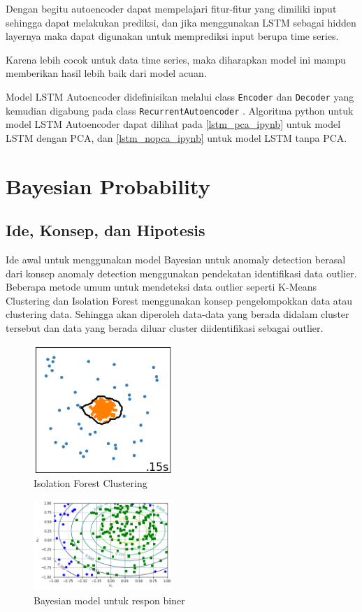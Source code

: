 Dengan begitu autoencoder dapat mempelajari fitur-fitur yang dimiliki input sehingga dapat melakukan prediksi, dan jika menggunakan LSTM sebagai hidden layernya maka dapat digunakan untuk memprediksi input berupa time series.

Karena lebih cocok untuk data time series, maka diharapkan model ini mampu memberikan hasil lebih baik dari model acuan.

Model LSTM Autoencoder didefinisikan melalui class \texttt{Encoder} dan \texttt{Decoder} yang kemudian digabung pada class \texttt{RecurrentAutoencoder} \cite{lstm}. Algoritma python untuk model LSTM Autoencoder dapat dilihat pada \ref{lstm_pca_ipynb} untuk model LSTM dengan PCA, dan \ref{lstm_nopca_ipynb} untuk model LSTM tanpa PCA.

\section{Bayesian Probability}
\subsection{Ide, Konsep, dan Hipotesis}

Ide awal untuk menggunakan model Bayesian untuk anomaly detection berasal dari konsep anomaly detection menggunakan pendekatan identifikasi data outlier. Beberapa metode umum untuk mendeteksi data outlier seperti K-Means Clustering dan Isolation Forest menggunakan konsep pengelompokkan data atau clustering data. Sehingga akan diperoleh data-data yang berada didalam cluster tersebut dan data yang berada diluar cluster diidentifikasi sebagai outlier.

\begin{figure}[h]
    \centering
    \includegraphics[width=200px]{resources/Bayes/isoforest.png}
    \caption{Isolation Forest Clustering}
\end{figure}

\begin{figure}[h]
    \centering
    \includegraphics[width=200px]{resources/Bayes/bayes_model.png}
    \caption{Bayesian model untuk respon biner}
\end{figure}

